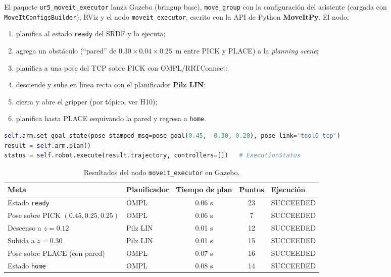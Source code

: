 \documentclass[11pt,letterpaper]{article}
\begin{document}
El paquete \texttt{ur5\_moveit\_executor} lanza Gazebo (bringup base), \texttt{move\_group} con la configuración del asistente (cargada con \texttt{MoveItConfigsBuilder}), RViz y el nodo \texttt{moveit\_executor}, escrito con la API de Python \textbf{MoveItPy}. El nodo:

\begin{enumerate}[leftmargin=*]
  \item planifica al estado \texttt{ready} del SRDF y lo ejecuta;
  \item agrega un obstáculo (``pared'' de $0.30\times0.04\times0.25$~m entre PICK y PLACE) a la \emph{planning scene};
  \item planifica a una pose del TCP sobre PICK con OMPL/RRTConnect;
  \item desciende y sube en línea recta con el planificador \textbf{Pilz LIN};
  \item cierra y abre el gripper (por tópico, ver H10);
  \item planifica hasta PLACE esquivando la pared y regresa a \texttt{home}.
\end{enumerate}

\begin{lstlisting}[language=Python]
self.arm.set_goal_state(pose_stamped_msg=pose_goal(0.45, -0.30, 0.20), pose_link='tool0_tcp')
result = self.arm.plan()
status = self.robot.execute(result.trajectory, controllers=[])   # ExecutionStatus
\end{lstlisting}

\begin{table}[H]
\centering
\caption{Resultados del nodo \texttt{moveit\_executor} en Gazebo.}
\label{tab:exec}
\begin{tabular}{@{}l l c c l@{}}
\toprule
Meta & Planificador & Tiempo de plan & Puntos & Ejecución \\
\midrule
Estado \texttt{ready} & OMPL & 0.06 s & 23 & SUCCEEDED \\
Pose sobre PICK $(0.45, 0.25, 0.25)$ & OMPL & 0.06 s & 7 & SUCCEEDED \\
Descenso a $z=0.12$ & Pilz LIN & 0.01 s & 12 & SUCCEEDED \\
Subida a $z=0.30$ & Pilz LIN & 0.01 s & 15 & SUCCEEDED \\
Pose sobre PLACE (con pared) & OMPL & 0.07 s & 16 & SUCCEEDED \\
Estado \texttt{home} & OMPL & 0.08 s & 14 & SUCCEEDED \\
\bottomrule
\end{tabular}
\end{table}
\end{document}
